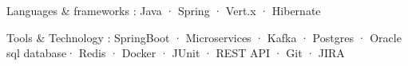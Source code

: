 

\begin{cvskills}

  \cvskill
    {Languages \& frameworks :} %
    {Java · Spring · Vert.x · Hibernate} %

  \cvskill
    {Tools \& Technology :} %
    {SpringBoot · Microservices · Kafka · Postgres · Oracle sql database· Redis · Docker · JUnit · REST API · Git · JIRA} %

\end{cvskills}
